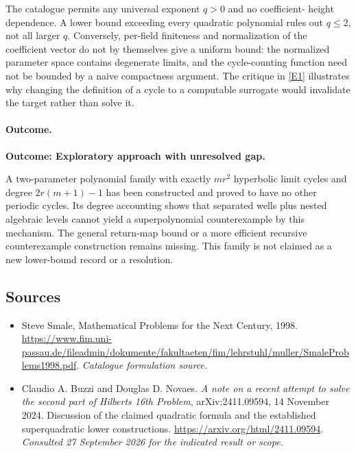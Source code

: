 \documentclass[11pt,a4paper]{article}
\newcommand{\eref}[2]{\hyperlink{extra:#1:#2}{[E#2]}}
\numberwithin{equation}{section}
\begin{document}
The catalogue permits any universal exponent $q>0$ and no coefficient-
height dependence.  A lower bound exceeding every quadratic polynomial
rules out $q\leq2$, not all larger $q$.  Conversely, per-field finiteness
and normalization of the coefficient vector do not by themselves give
a uniform bound: the normalized parameter space contains degenerate
limits, and the cycle-counting function need not be bounded by a
naive compactness argument.  The critique in \eref{statement}{1} illustrates
why changing the definition of a cycle to a computable surrogate would
invalidate the target rather than solve it.

\paragraph{Outcome.}
\textbf{Outcome: Exploratory approach with unresolved gap.}

A two-parameter polynomial family with exactly $mr^2$ hyperbolic limit
cycles and degree $2r(m+1)-1$ has been constructed and proved to have
no other periodic cycles.  Its degree accounting shows that separated
wells plus nested algebraic levels cannot yield a superpolynomial
counterexample by this mechanism.  The general return-map bound or a
more efficient recursive counterexample construction remains missing.
This family is not claimed as a new lower-bound record or a resolution.
\subsection{Sources}
\begin{itemize}\raggedright
\item[\textnormal{[S1]}]\hypertarget{source:statement:1}{} Steve Smale, Mathematical Problems for the Next Century, 1998.
\url{https://www.fim.uni-passau.de/fileadmin/dokumente/fakultaeten/fim/lehrstuhl/muller/SmaleProblems1998.pdf}.
{\small\textit{Catalogue formulation source.}}
\item[\textnormal{[E1]}]\hypertarget{extra:statement:1}{} Claudio A. Buzzi and Douglas D. Novaes.
\emph{A note on a recent attempt to solve the second part of Hilbert\textquotesingle s 16th Problem}, arXiv:2411.09594, 14 November 2024. Discussion of the claimed quadratic formula and the established superquadratic lower constructions.
\url{https://arxiv.org/html/2411.09594}.
{\small\textit{Consulted 27 September 2026 for the indicated result or scope.}}
\end{itemize}
\end{document}
